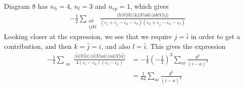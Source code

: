 Diagram 8 has $n_h = 4$, $n_l = 3$ and $n_{ep} = 1$, which gives
\begin{align*}
    -\frac{1}{2} \sum_{\substack{ab \\ ijkl}} \frac{
        \langle li \vert V \vert lk \rangle
        \langle kj \vert V \vert ab \rangle
        \langle ab \vert V \vert ij \rangle
    }{
        (
            \varepsilon_i + \varepsilon_j - \varepsilon_a - \varepsilon_b
        )(
            \varepsilon_k + \varepsilon_j - \varepsilon_a - \varepsilon_b
        )
    }
\end{align*}
Looking closer at the expression, we see that we require $j = \bar{i}$ in order to get a contribution, and then $k = \bar{j} = i$, and also $l = \bar{i}$. %
This gives the expression
\begin{align*}
    -\frac{1}{2} \sum_{\substack{ai}} \frac{
        \langle \bar{i} i \vert V \vert \bar{i} i \rangle %
        \langle i \bar{i} \vert V \vert a \bar{a} \rangle %
        \langle a \bar{a} \vert V \vert i \bar{i} \rangle %
    }{
        4(
            \varepsilon_i - \varepsilon_a
        )(
            \varepsilon_i - \varepsilon_a
        )
    } &= -\frac{1}{8} \left( -\frac{1}{2} \right)^3 \sum_{ai} \frac{
        g^3
    }{(i - a)^2} \\
    &= \frac{1}{64} \sum_{ai} \frac{
        g^3
    }{(i - a)^2}
\end{align*}


